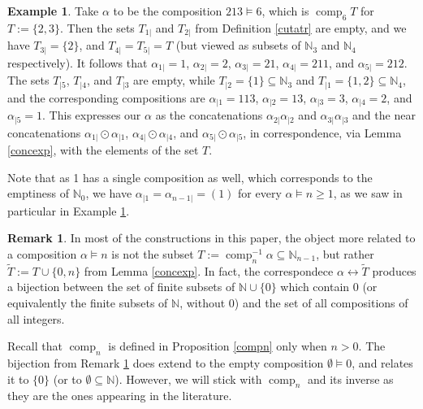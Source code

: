 \documentclass{article}
\theoremstyle{definition}
\newtheorem{rmk}[thm]{Remark}
\newtheorem{ex}[thm]{Example}
\begin{document}
\begin{ex}
Take $\alpha$ to be the composition $213\vDash6$, which is $\operatorname{comp}_{6}T$ for $T:=\{2,3\}$. Then the sets $T_{1|}$ and $T_{2|}$ from Definition \ref{cutatr} are empty, and we have $T_{3|}=\{2\}$, and $T_{4|}=T_{5|}=T$ (but viewed as subsets of $\mathbb{N}_{3}$ and $\mathbb{N}_{4}$ respectively). It follows that $\alpha_{1|}=1$, $\alpha_{2|}=2$, $\alpha_{3|}=21$, $\alpha_{4|}=211$, and $\alpha_{5|}=212$. The sets $T_{|5}$, $T_{|4}$, and $T_{|3}$ are empty, while $T_{|2}=\{1\}\subseteq\mathbb{N}_{3}$ and $T_{|1}=\{1,2\}\subseteq\mathbb{N}_{4}$, and the corresponding compositions are $\alpha_{|1}=113$, $\alpha_{|2}=13$, $\alpha_{|3}=3$, $\alpha_{|4}=2$, and $\alpha_{|5}=1$. This expresses our $\alpha$ as the concatenations $\alpha_{2|}\alpha_{|2}$ and $\alpha_{3|}\alpha_{|3}$ and the near concatenations $\alpha_{1|}\odot\alpha_{|1}$, $\alpha_{4|}\odot\alpha_{|4}$, and $\alpha_{5|}\odot\alpha_{|5}$, in correspondence, via Lemma \ref{concexp}, with the elements of the set $T$. \label{excomp}
\end{ex}
Note that as 1 has a single composition as well, which corresponds to the emptiness of $\mathbb{N}_{0}$, we have $\alpha_{|1}=\alpha_{n-1|}=(1)$ for every $\alpha \vDash n\geq1$, as we saw in particular in Example \ref{excomp}.
\begin{rmk}
In most of the constructions in this paper, the object more related to a composition $\alpha \vDash n$ is not the subset $T:=\operatorname{comp}_{n}^{-1}\alpha\subseteq\mathbb{N}_{n-1}$, but rather $\tilde{T}:=T\cup\{0,n\}$ from Lemma \ref{concexp}. In fact, the correspondece $\alpha\leftrightarrow\tilde{T}$ produces a bijection between the set of finite subsets of $\mathbb{N}\cup\{0\}$ which contain 0 (or equivalently the finite subsets of $\mathbb{N}$, without 0) and the set of all compositions of all integers. \label{gencomp}
\end{rmk}
Recall that $\operatorname{comp}_{n}$ is defined in Proposition \ref{compn} only when $n>0$. The bijection from Remark \ref{gencomp} does extend to the empty composition $\emptyset\vDash0$, and relates it to $\{0\}$ (or to $\emptyset\subseteq\mathbb{N}$). However, we will stick with $\operatorname{comp}_{n}$ and its inverse as they are the ones appearing in the literature.

\medskip
\end{document}
